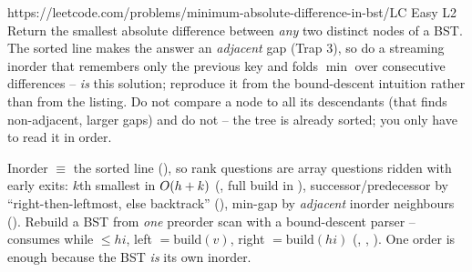 \begin{practiceset}
    {https://leetcode.com/problems/minimum-absolute-difference-in-bst/}{LC Easy L2}
    {Return the smallest absolute difference between \emph{any} two distinct nodes of a BST. The
    sorted line makes the answer an \emph{adjacent} gap (Trap 3), so do a streaming inorder that
    remembers only the previous key and folds $\min$ over consecutive differences -- 
    \emph{is} this solution; reproduce it from the bound-descent intuition rather than from the
    listing. Do not compare a node to all its descendants (that finds non-adjacent, larger gaps) and
    do not  -- the tree is already sorted; you only have to read it in order.}
\end{practiceset}

\begin{recallbox}
Inorder $\equiv$ the sorted line (), so rank questions are array questions ridden
with early exits: $k$th smallest in $O(h+k)$ (, full build in ),
successor/predecessor by ``right-then-leftmost, else backtrack'' (), min-gap by
\emph{adjacent} inorder neighbours (). Rebuild a BST from \emph{one} preorder scan
with a bound-descent parser --  consumes while $\le\mathit{hi}$, left $=\text{build}(v)$,
right $=\text{build}(\mathit{hi})$ (, , ).
One order is enough because the BST \emph{is} its own inorder.
\end{recallbox}
